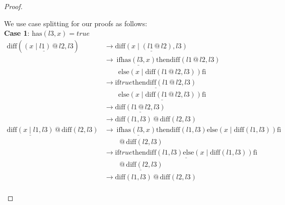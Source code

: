 \documentclass[12pt, a4paper]{article}
\newcommand{\rel}[1]{\mathrel{#1}}
\newcommand{\rmx}[1]{\mathrm{#1}}
\newcommand{\larrow}{\longrightarrow}
\newcommand{\under}{\underline}
\begin{document}
\begin{proof}
\begin{description}
We use case splitting for our proofs as follows: \\
\textbf{Case 1}: $\rmx{has}(l3, x) = true$
\begin{align*}
\rmx{diff}(\under{(x \rel{|} l1) \rel{@} l2}, l3)
	&\larrow \under{\rmx{diff}(x \rel{|} (l1 \rel{@} l2), l3)} \tag{by } \\
	&\larrow\ \rel{\rmx{if}} \under{\rmx{has}(l3, x)} \rel{\rmx{then}} \rmx{diff}(l1 \rel{@} l2, l3) \\
	&\quad \quad \rel{\rmx{else}} (x \rel{|} \rmx{diff}(l1 \rel{@} l2, l3)) \rel{\rmx{fi}} \tag{by diff2} \\
	&\larrow \under{\rel{\rmx{if}} true \rel{\rmx{then}} \rmx{diff}(l1 \rel{@} l2, l3)} \\
	&\quad \quad \under{\rel{\rmx{else}} (x \rel{|} \rmx{diff}(l1 \rel{@} l2, l3)) \rel{\rmx{fi}}} \tag{by case splitting} \\
	&\larrow \under{\rmx{diff}(l1 \rel{@} l2, l3)} \tag{by if1} \\
	&\larrow \rmx{diff}(l1, l3) \rel{@} \rmx{diff}(l2, l3) \tag{by IH} \\
\under{\rmx{diff}(x \rel{|} l1, l3)} \rel{@} \rmx{diff}(l2, l3)
	&\larrow\ \rel{\rmx{if}} \under{\rmx{has}(l3, x)} \rel{\rmx{then}} \rmx{diff}(l1, l3) \rel{\rmx{else}} (x \rel{|} \rmx{diff}(l1, l3)) \rel{\rmx{fi}} \\
	&\quad \quad \rel{@} \rmx{diff}(l2, l3) \tag{by diff2} \\
	&\larrow \under{\rel{\rmx{if}} true \rel{\rmx{then}} \rmx{diff}(l1, l3) \rel{\rmx{else}} (x \rel{|} \rmx{diff}(l1, l3)) \rel{\rmx{fi}}} \\
	&\quad \quad \under{\rel{@} \rmx{diff}(l2, l3)} \tag{by case splitting} \\
	&\larrow \rmx{diff}(l1, l3) \rel{@} \rmx{diff}(l2, l3) \tag{by if1} \\
\end{align*}


\end{description}
\end{proof}
\end{document}
